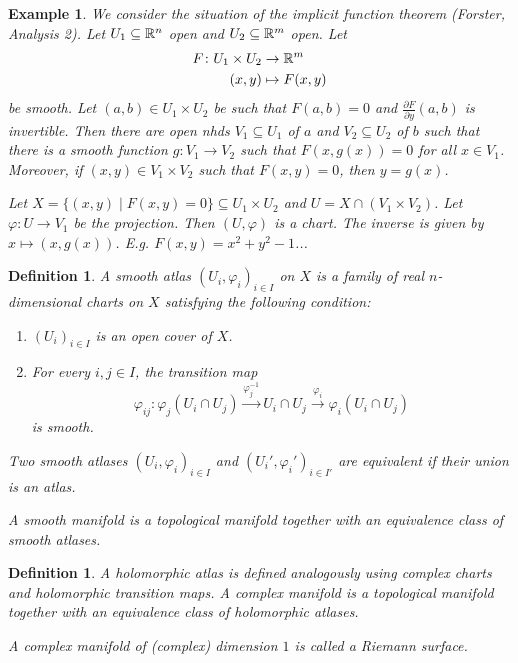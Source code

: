 \documentclass[A4paper, british, reqno]{amsart}
\theoremstyle{darkgreentheorem}
\theoremstyle{darkbluedefinition}
\newtheorem{defn}[thm]{Definition}
\theoremstyle{darkredexample}
\newtheorem{exa}[thm]{Example}
\theoremstyle{remark}
\newcommand{\1}{\mathbbm{1}}
\newcommand{\tms}{\times}
\begin{document}
\begin{exa}
    We consider the situation of the implicit function theorem (Forster, Analysis 2).
    Let $U_{1}\subseteq \mathbb{R}^{n}$ open and $U_{2}\subseteq \mathbb{R}^{m}$ open.
    Let
    \begin{align*}
	F\colon U_{1}\times U_{2} &\to \mathbb{R}^{m} \\
	(x,y) &\mapsto F(x,y)
    \end{align*}
    be smooth.
    Let $(a,b)\in U_{1}\times U_{2}$ be such that $F(a,b)=0$ and $\frac{\partial F}{\partial y}(a,b)$ is invertible.
    Then there are open nhds $V_{1}\subseteq U_{1}$ of $a$ and $V_{2}\subseteq U_{2}$ of $b$ such that there is a smooth function $g\colon V_{1}\to V_{2}$ such that $F(x,g(x))=0$ for all $x\in V_{1}$.
    Moreover, if $(x,y)\in V_{1}\times V_{2}$ such that $F(x,y)=0$, then $y=g(x)$.

    Let $X=\{(x,y)\mid F(x,y)=0\} \subseteq U_{1}\times U_{2}$ and $U=X\cap (V_{1}\tms V_{2})$.
    Let $\varphi \colon U\to V_{1}$ be the projection.
    Then $(U,\varphi)$ is a chart.
    The inverse is given by $x\mapsto (x,g(x))$.
    E.g. $F(x,y)=x^{2}+y^{2}-1$...
\end{exa}

\begin{defn}
    A \textit{smooth atlas} $(U_{i},\varphi_{i})_{i\in I}$ on $X$ is a family of real $n$-dimensional charts on $X$ satisfying the following condition:
    \begin{enumerate}[label=\arabic*)]
	\item $(U_{i})_{i\in I}$ is an open cover of $X$.
	\item For every $i,j\in I$, the transition map
	    \[\varphi_{ij}\colon \varphi_{j}(U_{i}\cap U_{j})\xrightarrow{\varphi_{j}^{-1}} U_{i}\cap U_{j}\xrightarrow{\varphi_{i}} \varphi_{i}(U_{i}\cap U_{j}) \]
	    is smooth.
    \end{enumerate}
    Two smooth atlases $(U_{i},\varphi_{i})_{i\in I}$ and $(U_{i}',\varphi_{i}')_{i\in I'}$ are equivalent if their union is an atlas.

    A \textit{smooth manifold} is a topological manifold together with an equivalence class of smooth atlases.
\end{defn}

\begin{defn}
    A \textit{holomorphic atlas} is defined analogously using complex charts and holomorphic transition maps.
    A \textit{complex manifold} is a topological manifold together with an equivalence class of holomorphic atlases.

    A complex manifold of (complex) dimension $1$ is called a \textit{Riemann surface}.
\end{defn}
\end{document}
